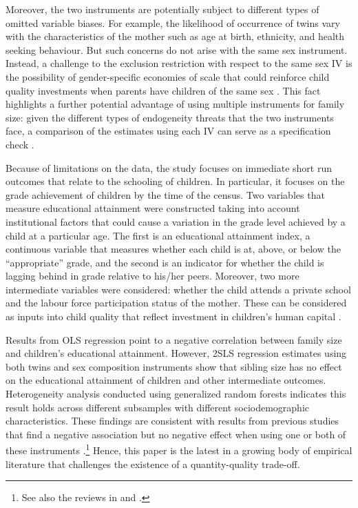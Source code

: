Moreover, the two instruments are potentially subject to different types of omitted variable biases. For example, the likelihood of occurrence of twins vary with the characteristics of the mother such as age at birth, ethnicity, and health seeking behaviour. But such concerns do not arise with the same sex instrument. Instead, a challenge to the exclusion restriction with respect to the same sex IV is the possibility of gender-specific economies of scale that could reinforce child quality investments when parents have children of the same sex \parencite{rosenzweig_natural_2000}. This fact highlights a further potential advantage of using multiple instruments for family size: given the different types of endogeneity threats that the two instruments face, a comparison of the estimates using each IV can serve as a specification check \parencite{angrist_multiple_2010}.

Because of limitations on the data, the study focuses on immediate short run outcomes that relate to the schooling of children. In particular, it focuses on the grade achievement of children by the time of the census. Two variables that measure educational attainment were constructed taking into account institutional factors that could cause a variation in the grade level achieved by a child at a particular age. The first is an educational attainment index, a continuous variable that measures whether each child is at, above, or below the “appropriate” grade, and the second is an indicator for whether the child is lagging behind in grade relative to his/her peers. Moreover, two more intermediate variables were considered: whether the child attends a private school and the labour force participation status of the mother. These can be considered as inputs into child quality that reflect investment in children’s human capital \parencite{caceres-delpiano_impacts_2006}.

Results from OLS regression point to a negative correlation between family size and children’s educational attainment. However, 2SLS regression estimates using both twins and sex composition instruments show that sibling size has no effect on the educational attainment of children and other intermediate outcomes. Heterogeneity analysis conducted using generalized random forests \parencite{Athey2019} indicates this result holds across different subsamples with different sociodemographic characteristics. These findings are consistent with results from previous studies that find a negative association but no negative effect when using one or both of these instruments \parencite[see, for example,][]{Black2005,Black2010,caceres-delpiano_impacts_2006,angrist_multiple_2010,bhalotra_twin_2020}.\footnote{See also the reviews in \textcite{clarke_children_2018} and \textcite{oberg_casual_2021}.} Hence, this paper is the latest in a growing body of empirical literature that challenges the existence of a quantity-quality trade-off.

